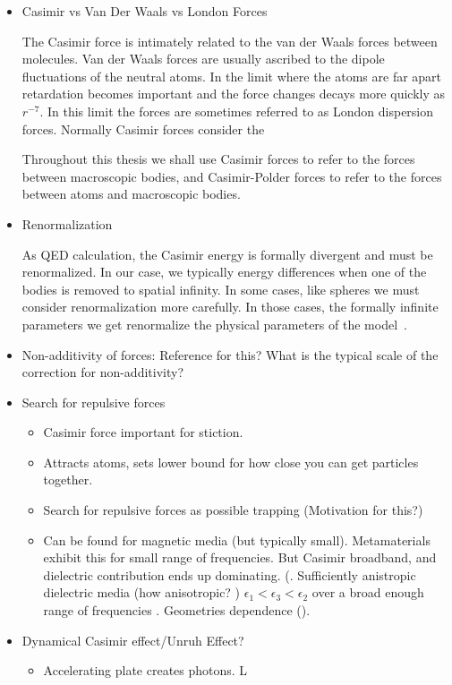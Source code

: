 \begin{itemize}
\item Casimir vs Van Der Waals vs London Forces

The Casimir force is intimately related to the van der Waals forces between molecules.
Van der Waals forces are usually ascribed to the dipole fluctuations of the 
neutral atoms.
In the limit where the atoms are far apart retardation becomes important and 
the force changes decays more quickly as $r^{-7}$.
  In this limit the forces are sometimes referred to as London dispersion forces.
  Normally Casimir forces consider the 

Throughout this thesis we shall use Casimir forces to refer to the forces between
 macroscopic bodies, and Casimir-Polder forces to refer to the forces between 
atoms and macroscopic bodies.  

\item Renormalization

As QED calculation, the Casimir energy is formally divergent and must be renormalized. 
 In our case, we typically energy differences when one of the bodies is 
removed to spatial infinity.
  In some cases, like spheres we must consider renormalization more carefully.
  In those cases, the formally infinite parameters we get renormalize the 
physical parameters of the model~\cite{Milton2001}.  

\item Non-additivity of forces:  Reference for this?  What is the typical scale of the correction for non-additivity?

\item Search for repulsive forces

\begin{itemize}
\item Casimir force important for stiction.
\item Attracts atoms, sets lower bound for how close you can get particles together.
\item Search for repulsive forces as possible trapping (Motivation for this?)
\item Can be found for magnetic media (but typically small).
  Metamaterials exhibit this for small range of frequencies.
  But Casimir broadband, and dielectric contribution ends up dominating.
  (.
Sufficiently anistropic dielectric media (how anisotropic? )
 $\epsilon_1<\epsilon_3<\epsilon_2$ over a broad enough range of frequencies 
.
   Geometries dependence ().
\end{itemize}
\item Dynamical Casimir effect/Unruh Effect?
\begin{itemize}
  \item Accelerating plate creates photons.  L
\end{itemize}
\end{itemize}


